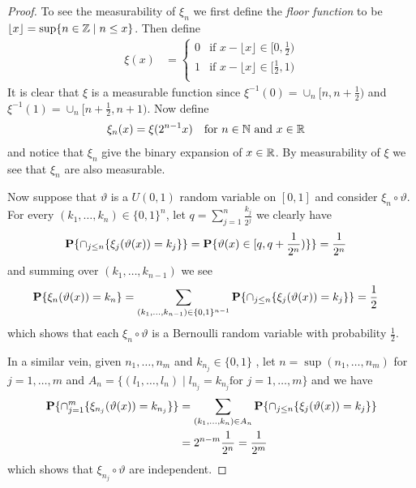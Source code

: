 \begin{proof}To see the measurability of $\xi_n$ we first define the
  \emph{floor function} to be $\lfloor x \rfloor = \sup \lbrace n \in
  \mathbb{Z} \mid n \leq x\rbrace$.  Then define
 \begin{align*}
\xi(x) &= \begin{cases}
0 & \text{if $x - \lfloor x \rfloor \in [0,\frac{1}{2})$} \\
1 & \text{if $x - \lfloor x \rfloor \in [\frac{1}{2},1)$} \\
\end{cases}
\end{align*}
It is clear that $\xi$ is a measurable function since $\xi^{-1}(0) =
\cup_n [n, n+\frac{1}{2})$ and  $\xi^{-1}(1) =
\cup_n [n+\frac{1}{2}, n+1)$.  Now define 
\begin{align*}
\xi_n(x) &= \xi(2^{n-1} x) & &\text{for $n \in \mathbb{N}$ and  $x \in \mathbb{R}$}
\end{align*}
and notice that $\xi_n$ give the binary expansion of $x \in \mathbb{R}$.
By measurability of $\xi$ we see that $\xi_n$ are also measurable.

Now suppose that $\vartheta$ is a $U(0,1)$ random variable on
$[0,1]$ and consider $\xi_n \circ \vartheta$.  For every $(k_1, \dots,
k_n) \in \lbrace 0,1\rbrace^n$, let $q = \sum_{j=1}^n \frac{k_j}{2^j}$ we clearly have 
\begin{align*}
\textbf{P}\{\cap_{j \leq n} \lbrace \xi_j(\vartheta(x)) = k_j \rbrace\}
  &= \textbf{P}\{\vartheta(x) \in [q, q+\frac{1}{2^{n}})
    \rbrace\} = \frac{1}{2^n}
\end{align*}
and summing over $(k_1, \dots, k_{n-1})$ we see 
\begin{align*}
\textbf{P}\{\xi_n(\vartheta(x)) = k_n\} &=\sum_{(k_1, \dots, k_{n-1})
  \in \lbrace 0,1\rbrace^{n-1}}\textbf{P}\{\cap_{j \leq n} \lbrace \xi_j(\vartheta(x)) = k_j \rbrace\}
  = \frac{1}{2}
\end{align*}
which shows that each $\xi_n \circ \vartheta$ is a Bernoulli random
variable with probability $\frac{1}{2}$.

In a similar vein, given $n_1, \dots, n_m$ and $k_{n_j} \in \lbrace 0,1 \rbrace$ , let $n = \sup(n_1, \dots,
n_m)$ for $j=1,\dots, m$ and  $A_n = \lbrace (l_1, \dots, l_n) \mid l_{n_j} = k_{n_j} \text{
  for } j=1, \dots , m\rbrace$ and we have 
\begin{align*}
\textbf{P}\{ \cap_{j=1}^m \lbrace \xi_{n_j} (\vartheta(x)) =
  k_{n_j} \rbrace \} &=\sum_{(k_1, \dots, k_{n})
  \in A_n}\textbf{P}\{\cap_{j \leq n} \lbrace
  \xi_j(\vartheta(x)) = k_j \rbrace\} \\
  &= 2^{n -m} \frac{1}{2^n} = \frac{1}{2^m}
\end{align*}
which shows that $\xi_{n_j} \circ \vartheta$ are independent.


\end{proof}
